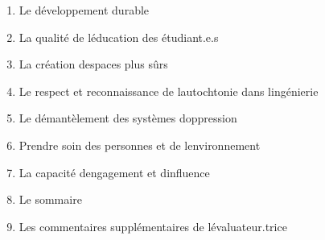 \begin{enumerate}
\begin{enumerate}
    \begin{enumerate}
     \item
      La diversité
    \end{enumerate}
   \item
    Le développement durable
   \item
    La qualité de l\textquotesingle éducation des étudiant.e.s
   \item
    La création d\textquotesingle espaces plus sûrs
   \item
    Le respect et reconnaissance de l\textquotesingle autochtonie dans l\textquotesingle ingénierie
   \item
    Le démantèlement des systèmes d\textquotesingle oppression
   \item
    Prendre soin des personnes et de l\textquotesingle environnement
   \item
    La capacité d\textquotesingle engagement et d\textquotesingle influence
   \item
    Le sommaire
   \item
    Les commentaires supplémentaires de l\textquotesingle évaluateur.trice
  \end{enumerate}
\end{enumerate}

